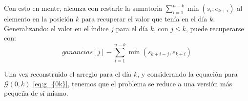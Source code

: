     Con esto en mente, alcanza con restarle la sumatoria 
$\sum_{i=1}^{n-k} \min (s_i, e_{k+i})$ al elemento en la posici\'on $k$ para
recuperar el valor que ten\'ia en el d\'ia $k$.\\
Generalizando: el valor en el \'indice $j$ para el d\'ia $k$, con $j \leq k$,
puede recuperarse con:
\begin{equation*}
    ganancias[j] - \sum_{i=1}^{n-k} \min (s_{k+i-j}, e_{k+i})
\end{equation*}

    Una vez reconstruido el arreglo para el d\'ia $k$, y considerando la
equaci\'on para $\mathcal{G} ( 0, k )$ \eqref{eq:g_{0k}}, tenemos que el problema
se reduce a una versi\'on m\'as peque\~na de s\'i mismo. 
